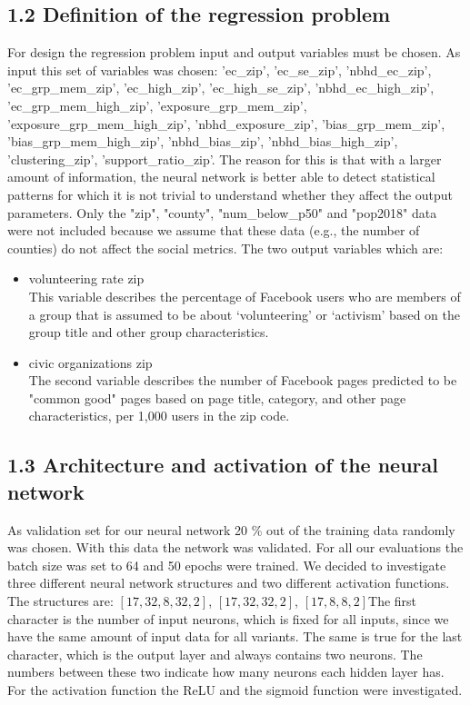 \subsection*{1.2 Definition of the regression problem}
For design the regression problem input and output variables must be chosen. As input this set of variables was chosen: 
'ec\_zip', 'ec\_se\_zip', 'nbhd\_ec\_zip', 'ec\_grp\_mem\_zip', 'ec\_high\_zip', 'ec\_high\_se\_zip', 'nbhd\_ec\_high\_zip', 'ec\_grp\_mem\_high\_zip', 'exposure\_grp\_mem\_zip', 'exposure\_grp\_mem\_high\_zip', 'nbhd\_exposure\_zip', 'bias\_grp\_mem\_zip', 'bias\_grp\_mem\_high\_zip', 'nbhd\_bias\_zip', 'nbhd\_bias\_high\_zip', 'clustering\_zip', 'support\_ratio\_zip'. 
The reason for this is that with a larger amount of information, the neural network is better able to detect statistical patterns for which it is not trivial to understand whether they affect the output parameters. Only the "zip", "county", "num\_below\_p50" and "pop2018" data were not included because we assume that these data (e.g., the number of counties) do not affect the social metrics.
The two output variables which are:
\begin{itemize}
  \item volunteering rate zip
  \\This variable describes the percentage of Facebook users who are members of a group that is assumed to be about ‘volunteering’ or ‘activism’ based on the group title and other group characteristics.
  \item civic organizations zip
  \\The second variable describes the number of Facebook pages predicted to be "common good" pages based on page title, category, and other page characteristics, per 1,000 users in the zip code.
\end{itemize}

\subsection*{1.3 Architecture and activation of the neural network}
As validation set for our neural network 20 \% out of the training data randomly was chosen. With this data the network was validated. For all our evaluations the batch size was set to 64 and 50 epochs were trained. We decided to investigate three different neural network structures and two different activation functions. The structures are: \newline$[17, 32, 8, 32, 2]$, $[17, 32, 32, 2]$, $[17, 8, 8, 2]$\newline The first character is the number of input neurons, which is fixed for all inputs, since we have the same amount of input data for all variants. The same is true for the last character, which is the output layer and always contains two neurons. The numbers between these two indicate how many neurons each hidden layer has. For the activation function the ReLU and the sigmoid function were investigated. 

